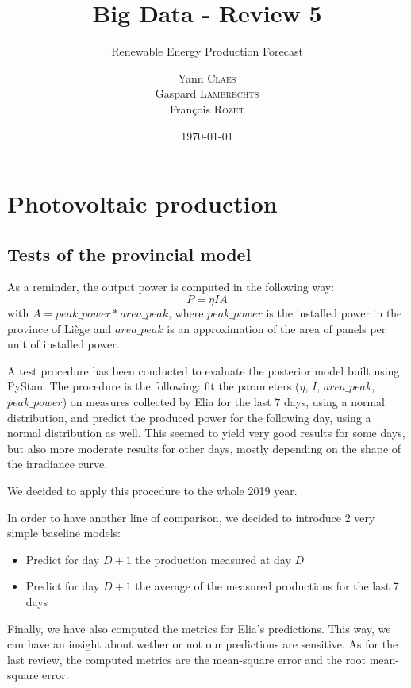 \documentclass[a4paper, 12pt]{article}
\institute{University of Liège}
\title{Big Data - Review 5}
\subtitle{Renewable Energy Production Forecast}
\author{Yann \textsc{Claes}\\Gaspard \textsc{Lambrechts}\\François \textsc{Rozet}}
\date{\today}
\begin{document}
\maketitle

\section{Photovoltaic production}
\subsection{Tests of the provincial model}
As a reminder, the output power is computed in the following way:
\begin{equation*}
    P = \eta I A
\end{equation*}
with $A = peak\_power * area\_peak$, where $peak\_power$ is the installed power in the province of Liège and $area\_peak$ is an approximation of the area of panels per unit of installed power.

A test procedure has been conducted to evaluate the posterior model built using PyStan. The procedure is the following: fit the parameters ($\eta$, $I$, $area\_peak$, $peak\_power$) on measures collected by Elia for the last 7 days, using a normal distribution, and predict the produced power for the following day, using a normal distribution as well. This seemed to yield very good results for some days, but also more moderate results for other days, mostly depending on the shape of the irradiance curve.

We decided to apply this procedure to the whole 2019 year.

In order to have another line of comparison, we decided to introduce 2 very simple baseline models: 
\begin{itemize}
    \item Predict for day $D+1$ the production measured at day $D$
    \item Predict for day $D+1$ the average of the measured productions for the last 7 days
\end{itemize}

Finally, we have also computed the metrics for Elia's predictions. This way, we can have an insight about wether or not our predictions are sensitive. As for the last review, the computed metrics are the mean-square error and the root mean-square error.
\end{document}

